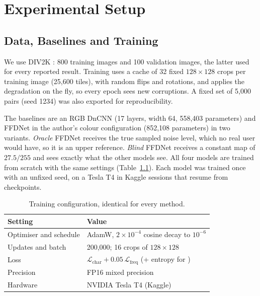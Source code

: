 \chapter{Experimental Setup}\label{ch:setup}

\section{Data, Baselines and Training}\label{sec:training}

We use DIV2K \cite{agustsson2017div2k}: 800 training images and 100
validation images, the latter used for every reported result. Training uses
a cache of 32 fixed $128\times128$ crops per training image (25,600 tiles),
with random flips and rotations, and applies the degradation on the fly, so
every epoch sees new corruptions. A fixed set of 5,000 pairs (seed 1234) was
also exported for reproducibility.

The baselines are an RGB DnCNN (17 layers, width 64, 558,403 parameters) and
FFDNet in the author's colour configuration (852,108 parameters) in two
variants. \emph{Oracle} FFDNet receives the true sampled noise level, which
no real user would have, so it is an upper reference. \emph{Blind} FFDNet
receives a constant map of $27.5/255$ and sees exactly what the other models
see. All four models are trained from scratch with the same settings
(Table~\ref{tab:hparams}). Each model was trained once with an unfixed seed,
on a Tesla T4 in Kaggle sessions that resume from checkpoints.

\begin{table}[htbp]
	\centering
	\caption{Training configuration, identical for every method.}
	\label{tab:hparams}
	\small
	\begin{tabular}{@{}ll@{}}
		\toprule
		Setting & Value \\
		\midrule
		Optimiser and schedule & AdamW, $2\times10^{-4}$ cosine decay to $10^{-6}$ \\
		Updates and batch      & 200,000; 16 crops of $128\times128$ \\
		Loss                   & $\mathcal{L}_\text{char}+0.05\,\mathcal{L}_\text{freq}$ (+ entropy for \fcsg{}) \\
		Precision              & FP16 mixed precision \\
		Hardware               & NVIDIA Tesla T4 (Kaggle) \\
		\bottomrule
	\end{tabular}
\end{table}

